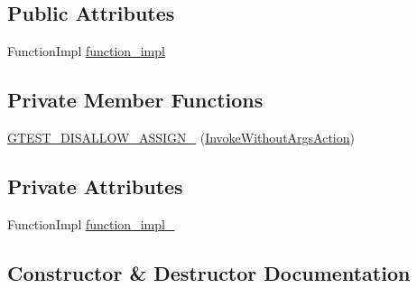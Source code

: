 \subsection*{Public Attributes}
\begin{DoxyCompactItemize}
\item 
Function\+Impl \mbox{\hyperlink{structtesting_1_1internal_1_1_invoke_without_args_action_a60320725a70c43f3257264ffc905fd71}{function\+\_\+impl}}
\end{DoxyCompactItemize}
\subsection*{Private Member Functions}
\begin{DoxyCompactItemize}
\item 
\mbox{\hyperlink{structtesting_1_1internal_1_1_invoke_without_args_action_a0fd67dbc88793c8a9cf3c31ab44de1c0}{G\+T\+E\+S\+T\+\_\+\+D\+I\+S\+A\+L\+L\+O\+W\+\_\+\+A\+S\+S\+I\+G\+N\+\_\+}} (\mbox{\hyperlink{structtesting_1_1internal_1_1_invoke_without_args_action}{Invoke\+Without\+Args\+Action}})
\end{DoxyCompactItemize}
\subsection*{Private Attributes}
\begin{DoxyCompactItemize}
\item 
Function\+Impl \mbox{\hyperlink{structtesting_1_1internal_1_1_invoke_without_args_action_a29e9e7e089dd4b66fc931c0da54809b1}{function\+\_\+impl\+\_\+}}
\end{DoxyCompactItemize}


\subsection{Constructor \& Destructor Documentation}
\mbox{\label{structtesting_1_1internal_1_1_invoke_without_args_action_a05d4006d8ab70e78172bf678b1d15f18}} 
